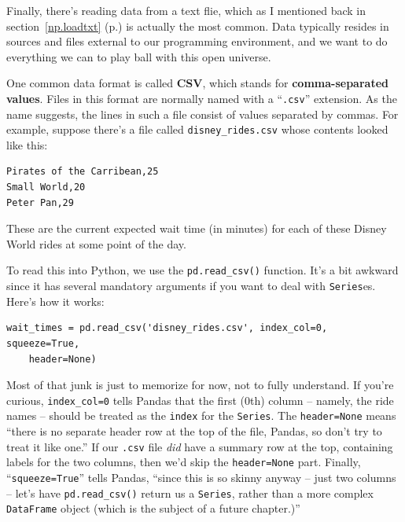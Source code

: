 Finally, there's reading data from a text flie, which as I mentioned back in
section~\ref{np.loadtxt} (p.\pageref{np.loadtxt}) is actually the most common. 
Data typically resides in sources and files external to our programming
environment, and we want to do everything we can to play ball with this open
universe.


One common data format is called \textbf{CSV}, which stands for
\textbf{comma-separated values}. Files in this format are normally named with a
``\texttt{.csv}'' extension. As the name suggests, the lines in such a file
consist of values separated by commas. For example, suppose there's a file
called \texttt{disney\_rides.csv} whose contents looked like this:

\begin{Verbatim}[fontsize=\small,samepage=true,frame=single,framesep=3mm]
Pirates of the Carribean,25
Small World,20
Peter Pan,29
\end{Verbatim}

These are the current expected wait time (in minutes) for each of these Disney
World rides at some point of the day.

\label{read_csv}

To read this into Python, we use the \texttt{pd.read\_csv()} function. It's a
bit awkward since it has several mandatory arguments if you want to deal with
\texttt{Series}es. Here's how it works:

\begin{Verbatim}[fontsize=\small,samepage=true,frame=single,framesep=3mm]
wait_times = pd.read_csv('disney_rides.csv', index_col=0, squeeze=True,
    header=None)
\end{Verbatim}

Most of that junk is just to memorize for now, not to fully understand. If
you're curious, \texttt{index\_col=0} tells Pandas that the first (0th) column
-- namely, the ride names -- should be treated as the \texttt{index} for the
\texttt{Series}. The \texttt{header=None} means ``there is no separate header
row at the top of the file, Pandas, so don't try to treat it like one.'' If our
\texttt{.csv} file \textit{did} have a summary row at the top, containing
labels for the two columns, then we'd skip the \texttt{header=None} part.
Finally, ``\texttt{squeeze=True}'' tells Pandas, ``since this is so skinny
anyway -- just two columns -- let's have \texttt{pd.read\_csv()} return us a
\texttt{Series}, rather than a more complex \texttt{DataFrame} object (which is
the subject of a future chapter.)''
